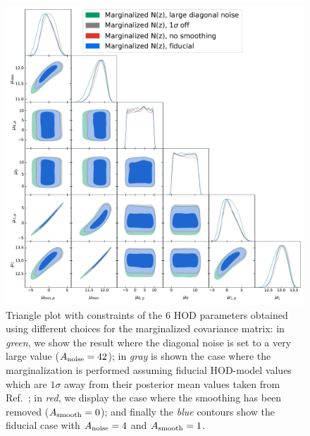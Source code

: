 \documentclass[a4paper,11pt]{article}
\begin{document}
\begin{figure}[ht]
\centering  
\includegraphics[width=1.\textwidth]{./triangle_marg_tests}
\caption{Triangle plot with constraints of the 6 HOD parameters obtained using different choices for the marginalized covariance matrix: in \textit{green}, we show the result where the diagonal noise is set to a very large value ($A_{\rm noise} = 42$); in \textit{gray} is shown the case where the marginalization is performed assuming fiducial HOD-model values which are $1\sigma$ away from their posterior mean values taken from Ref.~\cite{1912.08209}; in \textit{red}, we display the case where the smoothing has been removed ($A_{\rm smooth} = 0$); and finally the \textit{blue} contours show the fiducial case with $A_{\rm noise} = 4$ and $A_{\rm smooth} = 1$.}
\label{fig:triangle_marg_tests}
\end{figure}
\end{document}
